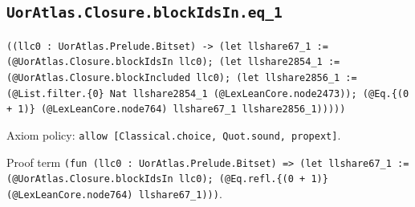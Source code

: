 \documentclass[11pt]{article}
\begin{document}
\subsection*{\texttt{UorAtlas.Closure.blockIdsIn.eq\_1}}
\noindent\texttt{((llc0 : UorAtlas.Prelude.Bitset) -> (let llshare67\_1 := (@UorAtlas.Closure.blockIdsIn llc0); (let llshare2854\_1 := (@UorAtlas.Closure.blockIncluded llc0); (let llshare2856\_1 := (@List.filter.\{0\} Nat llshare2854\_1 (@LexLeanCore.node2473)); (@Eq.\{(0 + 1)\} (@LexLeanCore.node764) llshare67\_1 llshare2856\_1)))))}\par
\noindent Axiom policy: \texttt{allow [Classical.choice, Quot.sound, propext]}.\par
\noindent Proof term \texttt{(fun (llc0 : UorAtlas.Prelude.Bitset) => (let llshare67\_1 := (@UorAtlas.Closure.blockIdsIn llc0); (@Eq.refl.\{(0 + 1)\} (@LexLeanCore.node764) llshare67\_1)))}.\par
\end{document}
